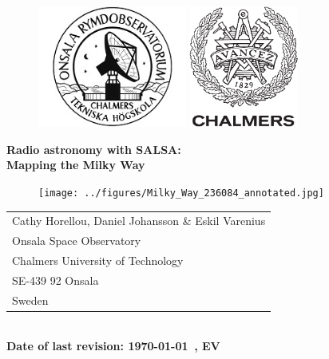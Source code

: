 \begin{titlepage}

\begin{figure}[t]
\vspace{-2cm}
\centering
\includegraphics[height=4cm]{../figures/OSO-logo.jpg}
\hspace{4cm}
\includegraphics[height=4cm]{../figures/CHALMERS-logo.pdf}
\vspace{1cm}
\end{figure}

\begin{center}
\Huge \textbf{
Radio astronomy with SALSA: 		\\
\bigskip
Mapping the Milky Way
}
\end{center}

\begin{figure}[!h]
\centering
\texttt{[image: ../figures/Milky\_Way\_236084\_annotated.jpg]}
\end{figure}


\begin{center}
\begin{tabular}{l}
Cathy Horellou, Daniel Johansson \& Eskil Varenius\\
Onsala Space Observatory		\\
Chalmers University of Technology	\\
SE-439 92 Onsala			\\
Sweden					\\
\end{tabular}\\
\vspace{0.5cm}
\yyyymmdddate
{\bf Date of last revision: \today \, \currenttime, EV}
\end{center}

\end{titlepage}

